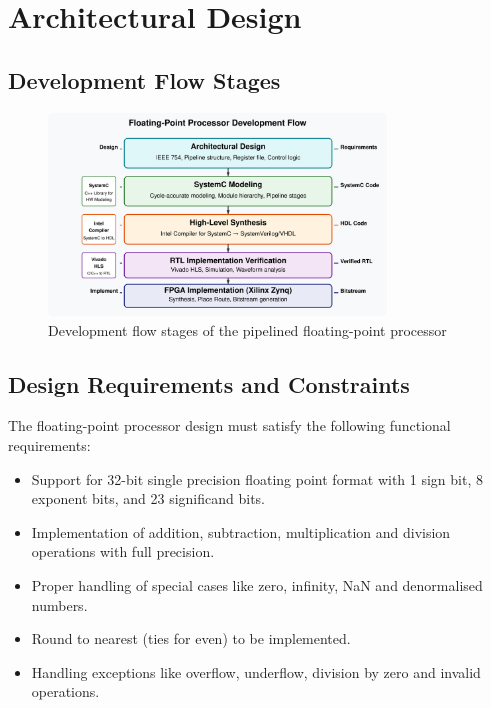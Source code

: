 \chapter{Architectural Design}
\label{chap:architecture}

\section{Development Flow Stages}
\label{sec:top_level}

\begin{figure}[h]
\centering
\includegraphics[width=0.8\textwidth]{figures/development.png}
\caption{Development flow stages of the pipelined floating-point processor}
\label{fig:top_level}
\end{figure}

\section{Design Requirements and Constraints}
\label{sec:design_req}

The floating-point processor design must satisfy the following functional requirements:

\begin{itemize}
\item Support for 32-bit single precision floating point format with 1 sign bit, 8 exponent bits, and 23 significand bits.
\item Implementation of addition, subtraction, multiplication and division operations with full precision.
\item Proper handling of special cases like zero, infinity, NaN and denormalised numbers.
\item Round to nearest (ties for even) to be implemented.
\item Handling exceptions like overflow, underflow, division by zero and invalid operations.
\end{itemize}


